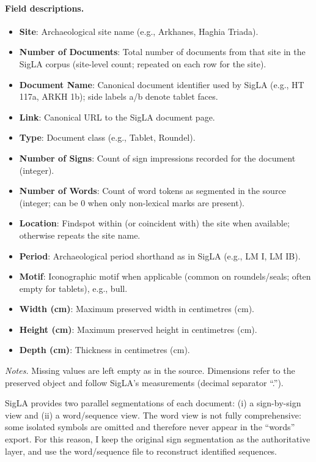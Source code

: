 \paragraph{Field descriptions.}
\begin{itemize}
    \item \textbf{Site}: Archaeological site name (e.g., Arkhanes, Haghia Triada).
    \item \textbf{Number of Documents}: Total number of documents from that site in the  SigLA corpus (site-level count; repeated on each row for the site).
    \item \textbf{Document Name}: Canonical document identifier used by  SigLA (e.g., HT 117a, ARKH 1b); side labels a/b denote tablet faces.
    \item \textbf{Link}: Canonical URL to the  SigLA document page.
    \item \textbf{Type}: Document class (e.g., Tablet, Roundel).
    \item \textbf{Number of Signs}: Count of sign impressions recorded for the document (integer).
    \item \textbf{Number of Words}: Count of word tokens as segmented in the source (integer; can be 0 when only non-lexical marks are present).
    \item \textbf{Location}: Findspot within (or coincident with) the site when available; otherwise repeats the site name.
    \item \textbf{Period}: Archaeological period shorthand as in  SigLA (e.g., LM I, LM IB).
    \item \textbf{Motif}: Iconographic motif when applicable (common on roundels/seals; often empty for tablets), e.g., bull.
    \item \textbf{Width (cm)}: Maximum preserved width in centimetres (cm).
    \item \textbf{Height (cm)}: Maximum preserved height in centimetres (cm).
    \item \textbf{Depth (cm)}: Thickness in centimetres (cm).
\end{itemize}

\noindent\emph{Notes.} Missing values are left empty as in the source. Dimensions refer to the preserved object and follow  SigLA’s measurements (decimal separator “.”).

SigLA provides two parallel segmentations of each document: (i) a sign-by-sign view and (ii) a word/sequence view. The word view is not fully comprehensive: some isolated symbols are omitted and therefore never appear in the “words” export. For this reason, I keep the original sign segmentation as the authoritative layer, and use the word/sequence file to reconstruct identified sequences.

